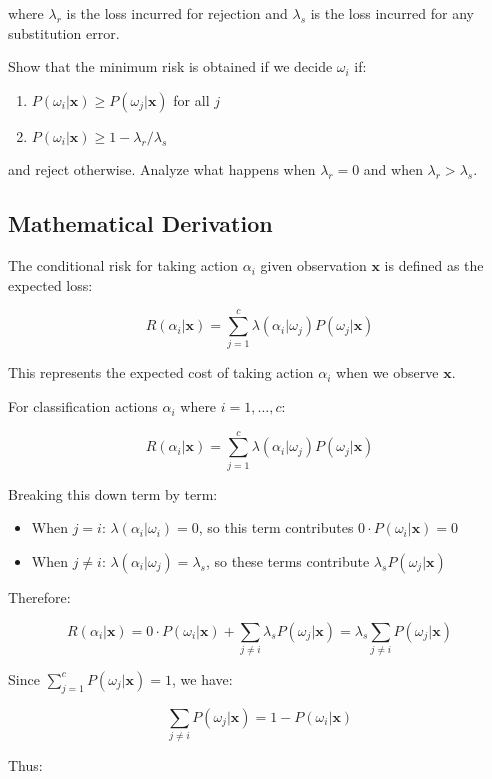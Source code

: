 \documentclass[12pt]{article}
\begin{document}
where $\lambda_r$ is the loss incurred for rejection and $\lambda_s$ is the loss incurred for any substitution error.

Show that the minimum risk is obtained if we decide $\omega_i$ if:
\begin{enumerate}
    \item $P(\omega_i|\mathbf{x}) \geq P(\omega_j|\mathbf{x})$ for all $j$
    \item $P(\omega_i|\mathbf{x}) \geq 1 - \lambda_r/\lambda_s$
\end{enumerate}
and reject otherwise. Analyze what happens when $\lambda_r = 0$ and when $\lambda_r > \lambda_s$.

\subsection{Mathematical Derivation}


The conditional risk for taking action $\alpha_i$ given observation $\mathbf{x}$ is defined as the expected loss:

\[
R(\alpha_i|\mathbf{x}) = \sum_{j=1}^c \lambda(\alpha_i|\omega_j)P(\omega_j|\mathbf{x})
\]

This represents the expected cost of taking action $\alpha_i$ when we observe $\mathbf{x}$.


For classification actions $\alpha_i$ where $i = 1, \ldots, c$:

\[
R(\alpha_i|\mathbf{x}) = \sum_{j=1}^c \lambda(\alpha_i|\omega_j)P(\omega_j|\mathbf{x})
\]

Breaking this down term by term:
\begin{itemize}
    \item When $j = i$: $\lambda(\alpha_i|\omega_i) = 0$, so this term contributes $0 \cdot P(\omega_i|\mathbf{x}) = 0$
    \item When $j \neq i$: $\lambda(\alpha_i|\omega_j) = \lambda_s$, so these terms contribute $\lambda_s P(\omega_j|\mathbf{x})$
\end{itemize}

Therefore:

\[
R(\alpha_i|\mathbf{x}) = 0 \cdot P(\omega_i|\mathbf{x}) + \sum_{j \neq i} \lambda_s P(\omega_j|\mathbf{x}) = \lambda_s \sum_{j \neq i} P(\omega_j|\mathbf{x})
\]

Since $\sum_{j=1}^c P(\omega_j|\mathbf{x}) = 1$, we have:

\[
\sum_{j \neq i} P(\omega_j|\mathbf{x}) = 1 - P(\omega_i|\mathbf{x})
\]

Thus:
\end{document}
